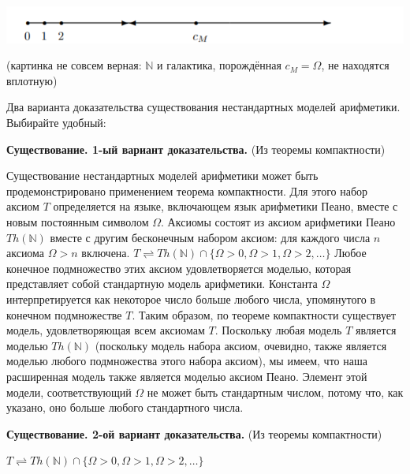 \includegraphics[scale=1]{images/1.16_стрелка1.PNG}

(картинка не совсем верная: $\mathbb{N}$ и галактика, порождённая $c_M = \Omega$, не находятся вплотную)

Два варианта доказательства существования нестандартных моделей арифметики. Выбирайте удобный:

\textbf{Существование. 1-ый вариант доказательства.} (Из теоремы компактности)

Существование нестандартных моделей арифметики может быть продемонстрировано применением теорема компактности. Для этого набор аксиом $T$ определяется на языке, включающем язык арифметики Пеано, вместе с новым постоянным символом $\Omega$. Аксиомы состоят из аксиом арифметики Пеано $Th(\mathbb{N})$ вместе с другим бесконечным набором аксиом: для каждого числа $n$ аксиома $\Omega > n$ включена. $T \rightleftharpoons Th(\mathbb{N}) \cap \{\Omega > 0, \Omega > 1, \Omega > 2, \ldots \}$ Любое конечное подмножество этих аксиом удовлетворяется моделью, которая представляет собой стандартную модель арифметики. Константа $\Omega$ интерпретируется как некоторое число больше любого числа, упомянутого в конечном подмножестве $T$. Таким образом, по теореме компактности существует модель, удовлетворяющая всем аксиомам $T$. Поскольку любая модель $T$ является моделью $Th(\mathbb{N})$ (поскольку модель набора аксиом, очевидно, также является моделью любого подмножества этого набора аксиом), мы имеем, что наша расширенная модель также является моделью аксиом Пеано. Элемент этой модели, соответствующий $\Omega$ не может быть стандартным числом, потому что, как указано, оно больше любого стандартного числа.

\textbf{Существование. 2-ой вариант доказательства.} (Из теоремы компактности)

$T \rightleftharpoons Th(\mathbb{N}) \cap \{\Omega > 0, \Omega > 1, \Omega > 2, \ldots \}$

